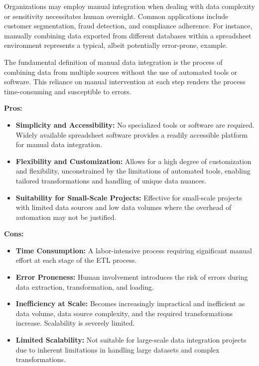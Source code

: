 \documentclass[12pt]{book}
\begin{document}
Organizations may employ manual integration when dealing with data complexity or sensitivity necessitates 
human oversight. Common applications include customer segmentation, fraud detection, and compliance adherence. 
For instance, manually combining data exported from different databases within a spreadsheet environment 
represents a typical, albeit potentially error-prone, example.

The fundamental definition of manual data integration is the process of combining data from multiple sources 
without the use of automated tools or software. This reliance on manual intervention at each step renders the 
process time-consuming and susceptible to errors.

\textbf{Pros:}

\begin{itemize}
    \item \textbf{Simplicity and Accessibility:}  No specialized tools or software are required. Widely available spreadsheet software provides a readily accessible platform for manual data integration.
    \item \textbf{Flexibility and Customization:} Allows for a high degree of customization and flexibility, unconstrained by the limitations of automated tools, enabling tailored transformations and handling of unique data nuances.
    \item \textbf{Suitability for Small-Scale Projects:}  Effective for small-scale projects with limited data sources and low data volumes where the overhead of automation may not be justified.
\end{itemize}

\textbf{Cons:}

\begin{itemize}
    \item \textbf{Time Consumption:}  A labor-intensive process requiring significant manual effort at each stage of the ETL process.
    \item \textbf{Error Proneness:}  Human involvement introduces the risk of errors during data extraction, transformation, and loading.
    \item \textbf{Inefficiency at Scale:}  Becomes increasingly impractical and inefficient as data volume, data source complexity, and the required transformations increase.  Scalability is severely limited.
    \item \textbf{Limited Scalability:} Not suitable for large-scale data integration projects due to inherent limitations in handling large datasets and complex transformations.
\end{itemize}
\end{document}
